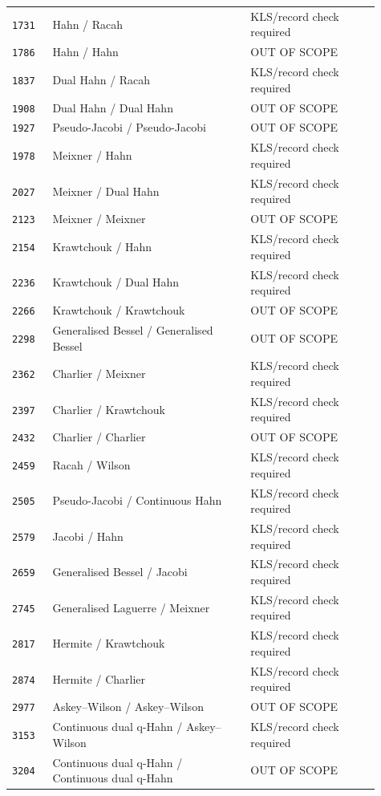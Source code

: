 \documentclass[11pt]{article}
\begin{document}
\begin{longtable}{@{}p{0.10\linewidth}p{0.49\linewidth}p{0.32\linewidth}@{}}
\texttt{1731} & Hahn / Racah & KLS/record check required \\
\texttt{1786} & Hahn / Hahn & OUT OF SCOPE \\
\texttt{1837} & Dual Hahn / Racah & KLS/record check required \\
\texttt{1908} & Dual Hahn / Dual Hahn & OUT OF SCOPE \\
\texttt{1927} & Pseudo-Jacobi / Pseudo-Jacobi & OUT OF SCOPE \\
\texttt{1978} & Meixner / Hahn & KLS/record check required \\
\texttt{2027} & Meixner / Dual Hahn & KLS/record check required \\
\texttt{2123} & Meixner / Meixner & OUT OF SCOPE \\
\texttt{2154} & Krawtchouk / Hahn & KLS/record check required \\
\texttt{2236} & Krawtchouk / Dual Hahn & KLS/record check required \\
\texttt{2266} & Krawtchouk / Krawtchouk & OUT OF SCOPE \\
\texttt{2298} & Generalised Bessel / Generalised Bessel & OUT OF SCOPE \\
\texttt{2362} & Charlier / Meixner & KLS/record check required \\
\texttt{2397} & Charlier / Krawtchouk & KLS/record check required \\
\texttt{2432} & Charlier / Charlier & OUT OF SCOPE \\
\texttt{2459} & Racah / Wilson & KLS/record check required \\
\texttt{2505} & Pseudo-Jacobi / Continuous Hahn & KLS/record check required \\
\texttt{2579} & Jacobi / Hahn & KLS/record check required \\
\texttt{2659} & Generalised Bessel / Jacobi & KLS/record check required \\
\texttt{2745} & Generalised Laguerre / Meixner & KLS/record check required \\
\texttt{2817} & Hermite / Krawtchouk & KLS/record check required \\
\texttt{2874} & Hermite / Charlier & KLS/record check required \\
\texttt{2977} & Askey--Wilson / Askey--Wilson & OUT OF SCOPE \\
\texttt{3153} & Continuous dual q-Hahn / Askey--Wilson & KLS/record check required \\
\texttt{3204} & Continuous dual q-Hahn / Continuous dual q-Hahn & OUT OF SCOPE \\

\end{longtable}
\end{document}
